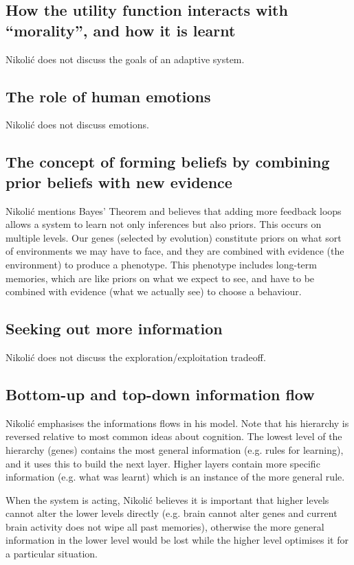 \documentclass[10pt,a4paper]{article}
\newcommand{\nquote}[1]{``{#1}''}
\begin{document}
\subsection{How the utility function interacts with \nquote{morality}, and how it is learnt}
Nikoli{\'c} does not discuss the goals of an adaptive system.

\subsection{The role of human emotions}
Nikoli{\'c} does not discuss emotions.

\subsection{The concept of forming beliefs by combining prior beliefs with new evidence}
Nikoli{\'c} mentions Bayes' Theorem and believes that adding more feedback loops allows a system to learn not only inferences but also priors. This occurs on multiple levels. Our genes (selected by evolution) constitute priors on what sort of environments we may have to face, and they are combined with evidence (the environment) to produce a phenotype. This phenotype includes long-term memories, which are like priors on what we expect to see, and have to be combined with evidence (what we actually see) to choose a behaviour.

\subsection{Seeking out more information}
Nikoli{\'c} does not discuss the exploration/exploitation tradeoff.

\subsection{Bottom-up and top-down information flow}
Nikoli{\'c} emphasises the informations flows in his model. Note that his hierarchy is reversed relative to most common ideas about cognition. The lowest level of the hierarchy (genes) contains the most general information (e.g. rules for learning), and it uses this to build the next layer. Higher layers contain more specific information (e.g. what was learnt) which is an instance of the more general rule.

When the system is acting, Nikoli{\'c} believes it is important that higher levels cannot alter the lower levels directly (e.g. brain cannot alter genes and current brain activity does not wipe all past memories), otherwise the more general information in the lower level would be lost while the higher level optimises it for a particular situation.
\end{document}
